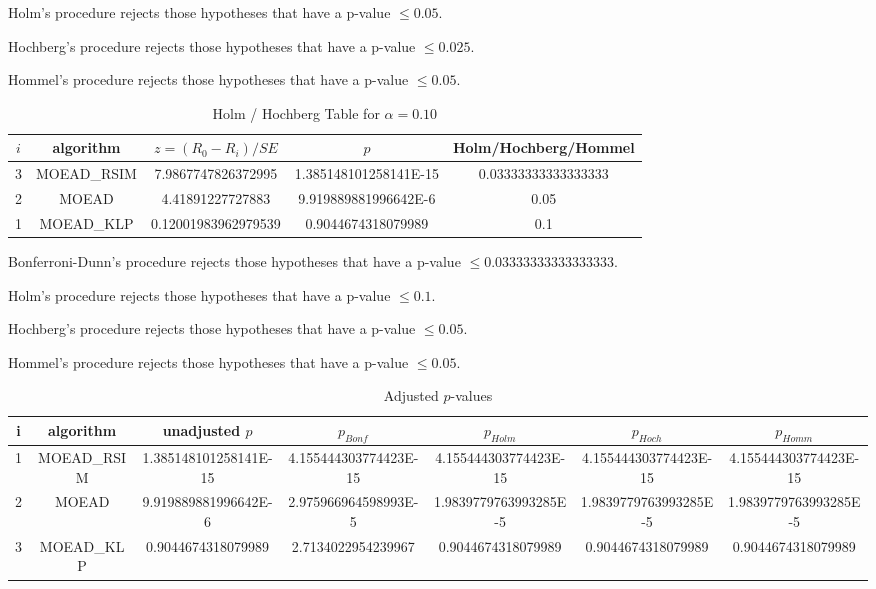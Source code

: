 \documentclass[a4paper,10pt]{article}
\begin{document}
\begin{landscape}
Holm's procedure rejects those hypotheses that have a p-value $\le0.05$.


Hochberg's procedure rejects those hypotheses that have a p-value $\le0.025$.


Hommel's procedure rejects those hypotheses that have a p-value $\le0.05$.


\begin{table}[!htp]
\centering\tiny
\caption{Holm / Hochberg Table for $\alpha=0.10$}
\begin{tabular}{ccccc}
$i$&algorithm&$z=(R_0 - R_i)/SE$&$p$&Holm/Hochberg/Hommel\\
\hline
3&MOEAD_RSIM&7.9867747826372995&1.385148101258141E-15&0.03333333333333333\\
2&MOEAD&4.41891227727883&9.919889881996642E-6&0.05\\
1&MOEAD_KLP&0.12001983962979539&0.9044674318079989&0.1\\
\hline
\end{tabular}
\end{table}
Bonferroni-Dunn's procedure rejects those hypotheses that have a p-value $\le0.03333333333333333$.


Holm's procedure rejects those hypotheses that have a p-value $\le0.1$.


Hochberg's procedure rejects those hypotheses that have a p-value $\le0.05$.


Hommel's procedure rejects those hypotheses that have a p-value $\le0.05$.


\begin{table}[!htp]
\centering\tiny
\caption{Adjusted $p$-values}
\begin{tabular}{ccccccc}
i&algorithm&unadjusted $p$&$p_{Bonf}$&$p_{Holm}$&$p_{Hoch}$&$p_{Homm}$\\
\hline
1&MOEAD_RSIM&1.385148101258141E-15&4.155444303774423E-15&4.155444303774423E-15&4.155444303774423E-15&4.155444303774423E-15\\
2&MOEAD&9.919889881996642E-6&2.975966964598993E-5&1.9839779763993285E-5&1.9839779763993285E-5&1.9839779763993285E-5\\
3&MOEAD_KLP&0.9044674318079989&2.7134022954239967&0.9044674318079989&0.9044674318079989&0.9044674318079989\\
\hline
\end{tabular}
\end{table}


\end{landscape}
\end{document}
